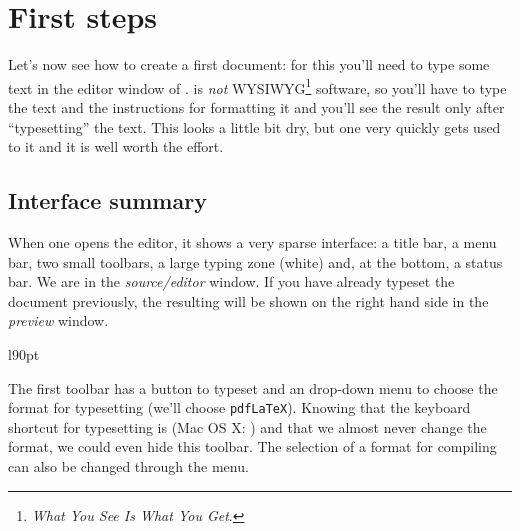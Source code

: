 
\chapter{First steps}
\label{chap:first-steps}

Let's now see how to create a first document: for this you'll need to type some text in the editor window of {\Tw}. {\AllTeX} is \emph{not} WYSIWYG\footnote{\emph{What You See Is What You Get}.} software, so you'll have to type the text and the instructions for formatting it and you'll see the result only after ``typesetting'' the text. This looks a little bit dry, but one very quickly gets used to it and it is well worth the effort.

\section{Interface summary}

\newsavebox{\inlineimg}

When one opens the editor, it shows a very sparse interface: a title bar, a menu bar, two small toolbars, a large typing zone (white) and, at the bottom, a status bar. We are in the \emph{source/editor} window. If you have already typeset the document previously, the resulting  will be shown on the right hand side in the \emph{preview} window.
\vspace{10pt}

\begin{wrapfigure}[2]{l}{90pt}
\vspace*{-1em}
\usebox{\inlineimg}
\end{wrapfigure}
\noindent The first toolbar has a button to typeset and an drop-down menu to choose the format for typesetting (we'll choose \verb+pdfLaTeX+). Knowing that the keyboard shortcut for typesetting is  (Mac OS X: ) and that we almost never change the format, we could even hide this toolbar. The selection of a format for compiling can also be changed through the  menu.
\vspace{10pt}

